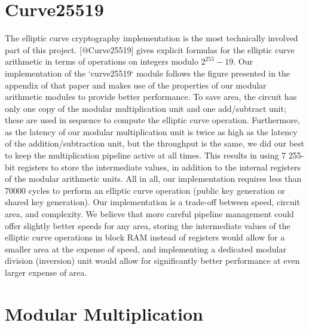 \documentclass[a4paper]{report}
\begin{document}
\section{Curve25519}

The elliptic curve cryptography implementation is the most technically involved
part of this project. [@Curve25519] gives explicit formulas for the elliptic
curve arithmetic in terms of operations on integers modulo $2^{255} - 19$. Our
implementation of the `curve25519` module follows the figure presented in the
appendix of that paper and makes use of the properties of our modular arithmetic
modules to provide better performance. To save area, the circuit has only one
copy of the modular multiplication unit and one add/subtract unit; these are
used in sequence to compute the elliptic curve operation. Furthermore, as the
latency of our modular multiplication unit is twice as high as the latency of
the addition/subtraction unit, but the throughput is the same, we did our best
to keep the multiplication pipeline active at all times. This results in using 7
255-bit registers to store the intermediate values, in addition to the internal
registers of the modular arithmetic units. All in all, our implementation
requires less than 70000 cycles to perform an elliptic curve operation (public
key generation or shared key generation). Our implementation is a trade-off
between speed, circuit area, and complexity. We believe that more careful
pipeline management could offer slightly better speeds for any area, storing the
intermediate values of the elliptic curve operations in block RAM instead of
registers would allow for a smaller area at the expense of speed, and
implementing a dedicated modular division (inversion) unit would allow for
significantly better performance at even larger expense of area.

\section{Modular Multiplication}
\end{document}
